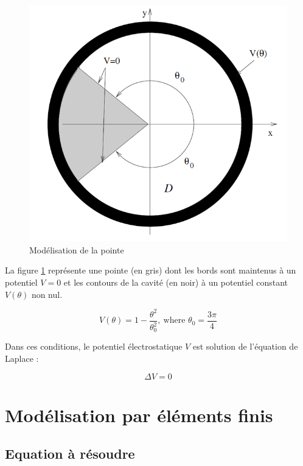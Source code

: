 \documentclass{article}
\begin{document}
\begin{figure}[!h]
    \centering
    \includegraphics[scale=0.7]{img/schema.png}
    \caption{Modélisation de la pointe}
    \label{fig:pointe}
\end{figure}

\hspace{0.5cm}
La figure \ref{fig:pointe} représente une pointe (en gris) dont les bords sont
maintenus à un potentiel $V=0$ et les contours de la cavité (en noir) à
un potentiel constant $V(\theta)$ non nul.

\begin{equation}
    V(\theta) = 1 - \frac{\theta^2}{\theta_0^2}, \ \text{where } \theta_0=\frac{3\pi}{4}
\end{equation}

Dans ces conditions, le potentiel électrostatique $V$ est solution de l'équation
de Laplace :

\begin{equation}
    \Delta V = 0
\end{equation}

\newpage

\section{Modélisation par éléments finis}

\subsection{Equation à résoudre}
\end{document}
